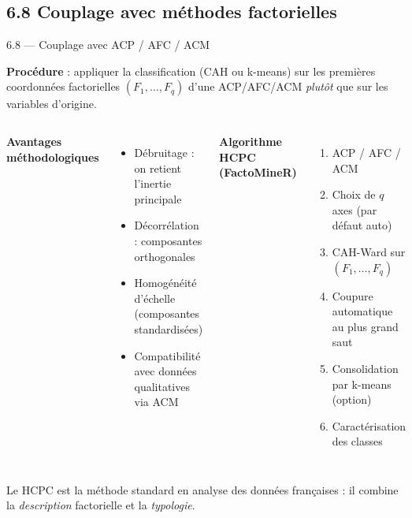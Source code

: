 \subsection{6.8 Couplage avec méthodes factorielles}
\begin{frame}{6.8 — Couplage avec ACP / AFC / ACM}
\begin{theorem}
\textbf{Procédure} : appliquer la classification (CAH ou k-means) sur les
\alert{premières coordonnées factorielles} $(F_1, \ldots, F_q)$ d'une ACP/AFC/ACM
\emph{plutôt} que sur les variables d'origine.
\end{theorem}

\begin{columns}[T]
\textbf{Avantages méthodologiques}
\begin{itemize}\small
  \item \alert{Débruitage} : on retient l'inertie principale
  \item \alert{Décorrélation} : composantes orthogonales
  \item Homogénéité d'échelle (composantes standardisées)
  \item Compatibilité avec données qualitatives via ACM
\end{itemize}
\textbf{Algorithme HCPC (FactoMineR)}
\begin{enumerate}\small
  \item ACP / AFC / ACM
  \item Choix de $q$ axes (par défaut auto)
  \item CAH-Ward sur $(F_1, \ldots, F_q)$
  \item Coupure automatique au plus grand saut
  \item Consolidation par k-means (option)
  \item Caractérisation des classes
\end{enumerate}
\end{columns}

\begin{rema}
\small Le HCPC est la méthode \alert{standard} en analyse des données françaises :
il combine la \emph{description} factorielle et la \emph{typologie}.
\end{rema}
\end{frame}

